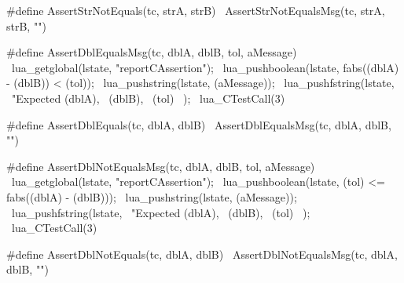 #define AssertStrNotEquals(tc, strA, strB) \
  AssertStrNotEqualsMsg(tc, strA, strB, "")
\stopCHeader

\stopTestSuite

\startTestSuite[assertDblEquals]

\startCHeader
#define AssertDblEqualsMsg(tc, dblA, dblB, tol, aMessage)    \
  lua_getglobal(lstate, "reportCAssertion");                 \
  lua_pushboolean(lstate, fabs((dblA) - (dblB)) < (tol));    \
  lua_pushstring(lstate, (aMessage));                        \
  lua_pushfstring(lstate,                                    \
      "Expected %
      (dblA),                                                \
      (dblB),                                                \
      (tol)                                                  \
    );                                                       \
  lua_CTestCall(3)

#define AssertDblEquals(tc, dblA, dblB) \
  AssertDblEqualsMsg(tc, dblA, dblB, "")
\stopCHeader

\stopTestSuite

\startTestSuite[assertDblNotEqals]

\startCHeader
#define AssertDblNotEqualsMsg(tc, dblA, dblB, tol, aMessage)     \
  lua_getglobal(lstate, "reportCAssertion");                     \
  lua_pushboolean(lstate, (tol) <= fabs((dblA) - (dblB)));       \
  lua_pushstring(lstate, (aMessage));                            \
  lua_pushfstring(lstate,                                        \
      "Expected %
      (dblA),                                                    \
      (dblB),                                                    \
      (tol)                                                      \
    );                                                           \
  lua_CTestCall(3)

#define AssertDblNotEquals(tc, dblA, dblB) \
  AssertDblNotEqualsMsg(tc, dblA, dblB, "")
\stopCHeader

\stopTestSuite
